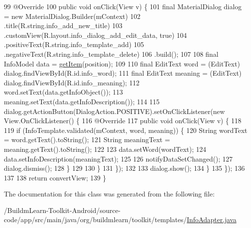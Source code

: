 \begin{DoxyCode}
99             @Override
100             \textcolor{keyword}{public} \textcolor{keywordtype}{void} onClick(View v) \{
101                 \textcolor{keyword}{final} MaterialDialog dialog = \textcolor{keyword}{new} MaterialDialog.Builder(mContext)
102                         .title(R.string.info\_add\_new\_title)
103                         .customView(R.layout.info\_dialog\_add\_edit\_data, \textcolor{keyword}{true})
104                         .positiveText(R.string.info\_template\_add)
105                         .negativeText(R.string.info\_template\_delete)
106                         .build();
107 
108                 \textcolor{keyword}{final} InfoModel data = \hyperlink{classorg_1_1buildmlearn_1_1toolkit_1_1templates_1_1InfoAdapter_a12c0148c366d316ed25b8765381eb4d1}{getItem}(position);
109 
110                 \textcolor{keyword}{final} EditText word = (EditText) dialog.findViewById(R.id.info\_word);
111                 \textcolor{keyword}{final} EditText meaning = (EditText) dialog.findViewById(R.id.info\_meaning);
112                 word.setText(data.getInfoObject());
113                 meaning.setText(data.getInfoDescription());
114 
115                 dialog.getActionButton(DialogAction.POSITIVE).setOnClickListener(\textcolor{keyword}{new} View.OnClickListener()
       \{
116                     @Override
117                     \textcolor{keyword}{public} \textcolor{keywordtype}{void} onClick(View v) \{
118 
119                         \textcolor{keywordflow}{if} (InfoTemplate.validated(mContext, word, meaning)) \{
120                             String wordText = word.getText().toString();
121                             String meaningText = meaning.getText().toString();
122 
123                             data.setWord(wordText);
124                             data.setInfoDescription(meaningText);
125 
126                             notifyDataSetChanged();
127                             dialog.dismiss();
128                         \}
129 
130                     \}
131                 \});
132 
133                 dialog.show();
134             \}
135         \});
136 
137 
138         \textcolor{keywordflow}{return} convertView;
139     \}
\end{DoxyCode}


The documentation for this class was generated from the following file\-:\begin{DoxyCompactItemize}
\item 
/\-Buildm\-Learn-\/\-Toolkit-\/\-Android/source-\/code/app/src/main/java/org/buildmlearn/toolkit/templates/\hyperlink{InfoAdapter_8java}{Info\-Adapter.\-java}\end{DoxyCompactItemize}
